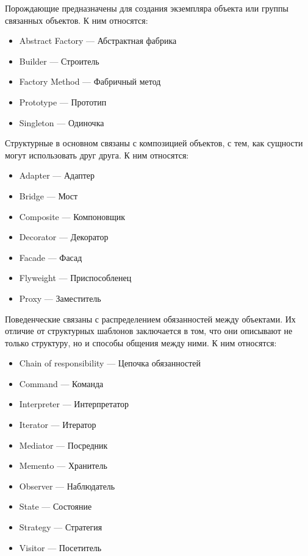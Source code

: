 \documentclass[12pt, a4paper]{book}%
\begin{document}
{Порождающие предназначены для создания экземпляра объекта или группы связанных объектов. К ним относятся:
\begin{itemize}
\item Abstract Factory — Абстрактная фабрика
\item Builder — Строитель
\item Factory Method — Фабричный метод
\item Prototype — Прототип
\item Singleton — Одиночка
\end{itemize}

Структурные в основном связаны с композицией объектов, с тем, как сущности могут использовать друг друга. К ним относятся:
\begin{itemize}
\item Adapter — Адаптер
\item Bridge — Мост
\item Composite — Компоновщик
\item Decorator — Декоратор
\item Facade — Фасад
\item Flyweight — Приспособленец
\item Proxy — Заместитель
\end{itemize}


Поведенческие связаны с распределением обязанностей между объектами. Их отличие от структурных шаблонов заключается в том, что они описывают не только структуру, но и способы общения между ними. К ним относятся:
\begin{itemize}
\item Chain of responsibility — Цепочка обязанностей
\item Command — Команда
\item Interpreter — Интерпретатор
\item Iterator — Итератор
\item Mediator — Посредник
\item Memento — Хранитель
\item Observer — Наблюдатель
\item State — Состояние
\item Strategy — Стратегия
\item Visitor — Посетитель
\end{itemize}

}
\end{document}
